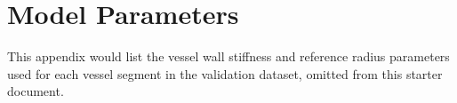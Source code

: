 \chapter{Model Parameters}

This appendix would list the vessel wall stiffness and reference radius
parameters used for each vessel segment in the validation dataset,
omitted from this starter document.
